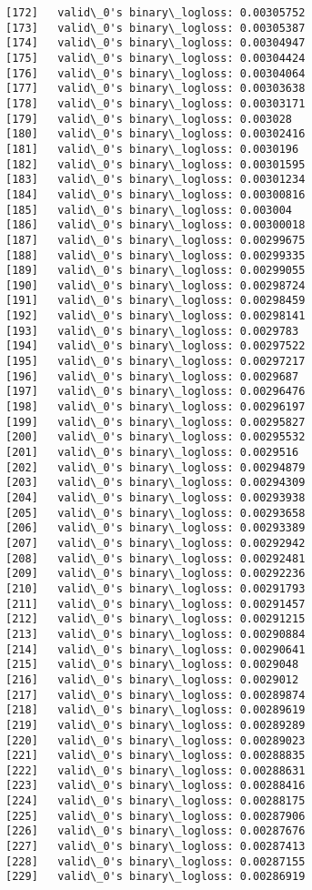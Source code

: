 \documentclass[11pt]{article}
\begin{document}
\begin{Verbatim}[commandchars=\\\{\}]
[172]	valid\_0's binary\_logloss: 0.00305752
[173]	valid\_0's binary\_logloss: 0.00305387
[174]	valid\_0's binary\_logloss: 0.00304947
[175]	valid\_0's binary\_logloss: 0.00304424
[176]	valid\_0's binary\_logloss: 0.00304064
[177]	valid\_0's binary\_logloss: 0.00303638
[178]	valid\_0's binary\_logloss: 0.00303171
[179]	valid\_0's binary\_logloss: 0.003028
[180]	valid\_0's binary\_logloss: 0.00302416
[181]	valid\_0's binary\_logloss: 0.0030196
[182]	valid\_0's binary\_logloss: 0.00301595
[183]	valid\_0's binary\_logloss: 0.00301234
[184]	valid\_0's binary\_logloss: 0.00300816
[185]	valid\_0's binary\_logloss: 0.003004
[186]	valid\_0's binary\_logloss: 0.00300018
[187]	valid\_0's binary\_logloss: 0.00299675
[188]	valid\_0's binary\_logloss: 0.00299335
[189]	valid\_0's binary\_logloss: 0.00299055
[190]	valid\_0's binary\_logloss: 0.00298724
[191]	valid\_0's binary\_logloss: 0.00298459
[192]	valid\_0's binary\_logloss: 0.00298141
[193]	valid\_0's binary\_logloss: 0.0029783
[194]	valid\_0's binary\_logloss: 0.00297522
[195]	valid\_0's binary\_logloss: 0.00297217
[196]	valid\_0's binary\_logloss: 0.0029687
[197]	valid\_0's binary\_logloss: 0.00296476
[198]	valid\_0's binary\_logloss: 0.00296197
[199]	valid\_0's binary\_logloss: 0.00295827
[200]	valid\_0's binary\_logloss: 0.00295532
[201]	valid\_0's binary\_logloss: 0.0029516
[202]	valid\_0's binary\_logloss: 0.00294879
[203]	valid\_0's binary\_logloss: 0.00294309
[204]	valid\_0's binary\_logloss: 0.00293938
[205]	valid\_0's binary\_logloss: 0.00293658
[206]	valid\_0's binary\_logloss: 0.00293389
[207]	valid\_0's binary\_logloss: 0.00292942
[208]	valid\_0's binary\_logloss: 0.00292481
[209]	valid\_0's binary\_logloss: 0.00292236
[210]	valid\_0's binary\_logloss: 0.00291793
[211]	valid\_0's binary\_logloss: 0.00291457
[212]	valid\_0's binary\_logloss: 0.00291215
[213]	valid\_0's binary\_logloss: 0.00290884
[214]	valid\_0's binary\_logloss: 0.00290641
[215]	valid\_0's binary\_logloss: 0.0029048
[216]	valid\_0's binary\_logloss: 0.0029012
[217]	valid\_0's binary\_logloss: 0.00289874
[218]	valid\_0's binary\_logloss: 0.00289619
[219]	valid\_0's binary\_logloss: 0.00289289
[220]	valid\_0's binary\_logloss: 0.00289023
[221]	valid\_0's binary\_logloss: 0.00288835
[222]	valid\_0's binary\_logloss: 0.00288631
[223]	valid\_0's binary\_logloss: 0.00288416
[224]	valid\_0's binary\_logloss: 0.00288175
[225]	valid\_0's binary\_logloss: 0.00287906
[226]	valid\_0's binary\_logloss: 0.00287676
[227]	valid\_0's binary\_logloss: 0.00287413
[228]	valid\_0's binary\_logloss: 0.00287155
[229]	valid\_0's binary\_logloss: 0.00286919

\end{Verbatim}
\end{document}
